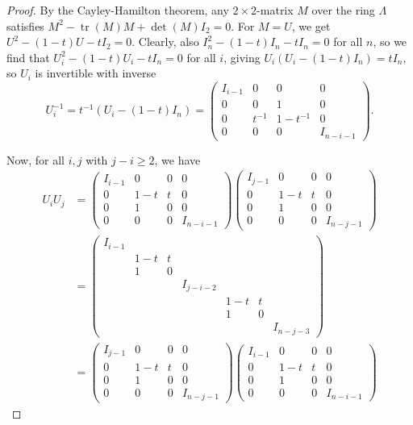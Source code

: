 \documentclass[reqno]{amsart}
\theoremstyle{definition}
\theoremstyle{remark}
\DeclareMathOperator{\tr}{tr}
\begin{document}
\begin{proof}
By the Cayley-Hamilton theorem, any $2 \times 2$-matrix
$M$ over the ring $\Lambda$ satisfies
$M^2 - \tr (M) M + \det (M) I_{2} = 0$. For
$M = U$, we get $U^2 - \left( 1-t \right) U - t I_2 = 0$.
Clearly, also $I_n^2 - (1-t) I_n - t I_n = 0$ for all $n$, so
we find that $U_i^2 - (1-t)U_i - t I_n = 0$ for all
$i$, giving
$U_i \left( U_i - (1-t)I_n \right) = t I_n$, so
$U_i$ is invertible with inverse
\[
U_i^{-1} =
t^{-1} \left( U_i - (1-t)I_n \right) 
=
\begin{pmatrix} I_{i-1} & 0 & 0 & 0\\
0 & 0 & 1 & 0\\
0 & t^{-1} & 1-t^{-1} & 0 \\
0 & 0 & 0 & I_{n-i-1} \end{pmatrix} .
\] 


Now, for all $i,j$ with $j-i \ge 2$, we have
\begin{align*}
    U_i U_j 
    &= 
    \begin{pmatrix} 
        I_{i-1} & 0 & 0 & 0\\
        0 & 1-t & t & 0 \\
        0 & 1 & 0 & 0\\
        0 & 0 & 0 & I_{n-i-1}
    \end{pmatrix} 
    \begin{pmatrix} 
        I_{j-1} & 0 & 0 & 0\\
        0 & 1-t & t & 0 \\
        0 & 1 & 0 & 0\\
        0 & 0 & 0 & I_{n-j-1}
    \end{pmatrix}\\
    &= 
    \begin{pmatrix} 
        I_{i-1} &  &  & & && \\
         & 1-t & t & & &&\\
         & 1 & 0 &  & &&\\
         &  &  & I_{j-i-2} & & &\\
          & & & & 1-t & t & \\
          &&&& 1 & 0&\\
          & &&&&& I_{n-j-3}
    \end{pmatrix} \\
    &=
    \begin{pmatrix} 
        I_{j-1} & 0 & 0 & 0\\
        0 & 1-t & t & 0 \\
        0 & 1 & 0 & 0\\
        0 & 0 & 0 & I_{n-j-1}
    \end{pmatrix}
    \begin{pmatrix} 
        I_{i-1} & 0 & 0 & 0\\
        0 & 1-t & t & 0 \\
        0 & 1 & 0 & 0\\
        0 & 0 & 0 & I_{n-i-1}
    \end{pmatrix} 
\end{align*}



\end{proof}
\end{document}
